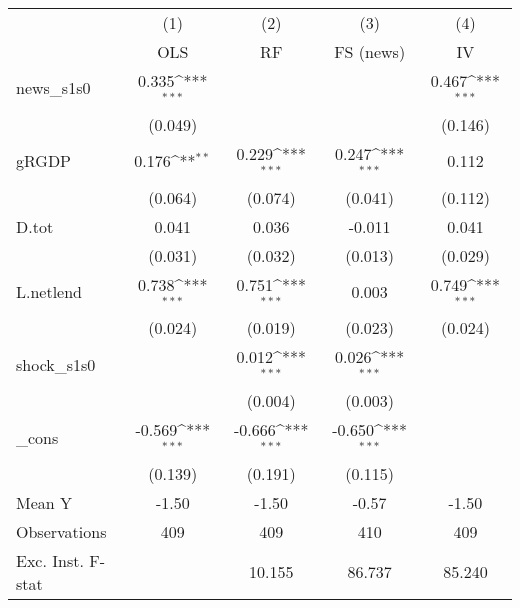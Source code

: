 {
\def\sym#1{\ifmmode^{#1}\else\(^{#1}\)\fi}
\begin{tabular}{l*{4}{c}}
\toprule
            &\multicolumn{1}{c}{(1)}&\multicolumn{1}{c}{(2)}&\multicolumn{1}{c}{(3)}&\multicolumn{1}{c}{(4)}\\
            &\multicolumn{1}{c}{OLS}&\multicolumn{1}{c}{RF}&\multicolumn{1}{c}{FS (news)}&\multicolumn{1}{c}{IV}\\
\midrule
news\_s1s0   &       0.335\sym{***}&                     &                     &       0.467\sym{***}\\
            &     (0.049)         &                     &                     &     (0.146)         \\
\addlinespace
gRGDP       &       0.176\sym{**} &       0.229\sym{***}&       0.247\sym{***}&       0.112         \\
            &     (0.064)         &     (0.074)         &     (0.041)         &     (0.112)         \\
\addlinespace
D.tot       &       0.041         &       0.036         &      -0.011         &       0.041         \\
            &     (0.031)         &     (0.032)         &     (0.013)         &     (0.029)         \\
\addlinespace
L.netlend   &       0.738\sym{***}&       0.751\sym{***}&       0.003         &       0.749\sym{***}\\
            &     (0.024)         &     (0.019)         &     (0.023)         &     (0.024)         \\
\addlinespace
shock\_s1s0  &                     &       0.012\sym{***}&       0.026\sym{***}&                     \\
            &                     &     (0.004)         &     (0.003)         &                     \\
\addlinespace
\_cons      &      -0.569\sym{***}&      -0.666\sym{***}&      -0.650\sym{***}&                     \\
            &     (0.139)         &     (0.191)         &     (0.115)         &                     \\
\midrule
Mean Y      &       -1.50         &       -1.50         &       -0.57         &       -1.50         \\
Observations&         409         &         409         &         410         &         409         \\
Exc. Inst. F-stat&                     &      10.155         &      86.737         &      85.240         \\
\bottomrule
\end{tabular}
}
